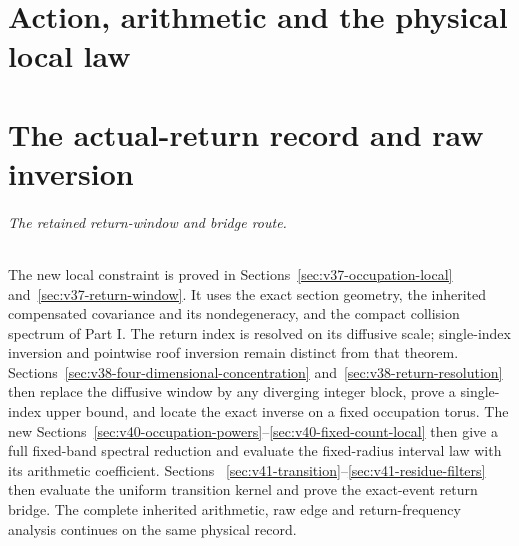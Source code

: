 \documentclass[11pt,reqno]{amsart}
\numberwithin{equation}{section}
\theoremstyle{definition}\newtheorem{definition}[theorem]{Definition}
\theoremstyle{remark}\newtheorem{remark}[theorem]{Remark}
\begin{document}
\part{Action, arithmetic and the physical local law}









\part{The actual-return record and raw inversion}
\paragraph{The retained return-window and bridge route.}
The new local constraint is proved in
Sections~\ref{sec:v37-occupation-local} and~\ref{sec:v37-return-window}.
It uses the exact section geometry, the inherited compensated
covariance and its nondegeneracy, and the compact collision spectrum
of Part I. The return index is resolved on its diffusive scale;
single-index inversion and pointwise roof inversion remain distinct
from that theorem. Sections~\ref{sec:v38-four-dimensional-concentration}
and~\ref{sec:v38-return-resolution} then replace the diffusive window
by any diverging integer block, prove a single-index upper bound, and
locate the exact inverse on a fixed occupation torus. The new
Sections~\ref{sec:v40-occupation-powers}--\ref{sec:v40-fixed-count-local}
then give a full fixed-band spectral reduction and evaluate the
fixed-radius interval law with its arithmetic coefficient. Sections~
\ref{sec:v41-transition}--\ref{sec:v41-residue-filters} then evaluate
the uniform transition kernel and prove the exact-event return bridge. The
complete inherited arithmetic, raw edge and return-frequency analysis
continues on the same physical record.

















\end{document}
